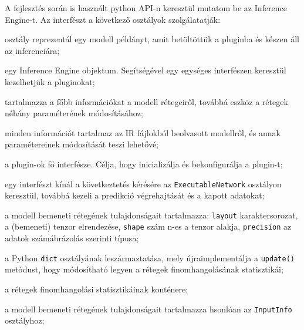 A fejlesztés során is használt python API-n keresztül mutatom be az Inference Engine-t. Az interfészt a következő osztályok szolgálatatják:
\begin{description}[noitemsep]
	\item[\PVerb{ExecutableNetwork}] osztály reprezentál egy modell példányt, amit betöltöttük a pluginba és készen áll az inferenciára;
	\item[\PVerb{IECore}] egy Inference Engine objektum. Segítségével egy egységes interfészen keresztül kezelhetjük a pluginokat;
	\item[\PVerb{IENetLayer}] tartalmazza a főbb információkat a modell rétegeiről, továbbá eszköz a rétegek néhány paraméterének módosításához;
	\item[\PVerb{IENetwork}] minden információt tartalmaz az IR fájlokból beolvasott modellről, és annak paramétereinek módosítását teszi lehetővé;
	\item[\PVerb{IEPlugin}] a plugin-ok fő interfésze. Célja, hogy inicializálja és bekonfigurálja a plugin-t;
	\item[\PVerb{InferRequest}] egy interfészt kínál a következtetés kérésére az  \verb|ExecutableNetwork| osztályon keresztül, továbbá kezeli a predikció végrehajtását és a kapott adatokat;
	\item[\PVerb{InputInfo}] a modell bemeneti rétegének tulajdonságait tartalmazza: \verb|layout| karaktersorozat, a (bemeneti) tenzor elrendezése\footnotemark, \verb|shape| szám n-es a tenzor alakja, \verb|precision| az adatok számábrázolás szerinti típusa;
	\item[\PVerb{LayersStatsMap}] a Python \verb|dict| osztályának leszármaztatása, mely újraimplementálja a \verb|update()| metódust, hogy módosítható legyen a rétegek finomhangolásának statisztikái;
	\item[\PVerb{LayerStats}] a rétegek finomhangolási statisztikáinak konténere;
	\item[\PVerb{OutputInfo}] a modell bemeneti rétegének tulajdonságait tartalmazza hsonlóan az \verb|InputInfo| osztályhoz;
\end{description}

